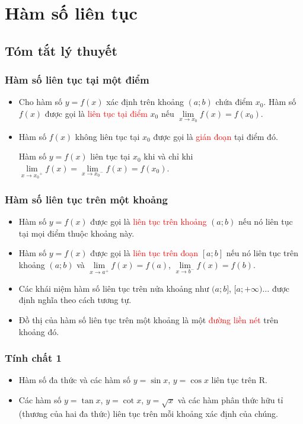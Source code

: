 \section{Hàm số liên tục}
\setcounter{dang}{0}
\subsection{Tóm tắt lý thuyết}
\begin{tomtat}
	\subsubsection{Hàm số liên tục tại một điểm}
	\begin{itemize}
		\item Cho hàm số $y=f(x)$ xác định trên khoảng $(a;b)$ chứa điểm $x_0$. Hàm số $f(x)$ được gọi là \textcolor{red}{liên tục tại điểm} $x_0$ nếu $\lim\limits_{x\to{x_0}}f(x)=f(x_0)$.
		\item Hàm số $f(x)$ không liên tục tại $x_0$ được gọi là \textcolor{red}{gián đoạn} tại điểm đó.
		\begin{note}
			Hàm số $y=f(x)$ liên tục tại $x_0$ khi và chỉ khi $\lim\limits_{x\to{x_0}^+}f(x)=\lim\limits_{x\to{x_0}^-}f(x)=f(x_0)$.
		\end{note}
	\end{itemize}
	\subsubsection{Hàm số liên tục trên một khoảng}
	\begin{itemize}
		\item Hàm số $y=f(x)$ được gọi là \textcolor{red}{liên tục trên khoảng} $(a;b)$ nếu nó liên tục tại mọi điểm thuộc khoảng này.
		\item Hàm số $y=f(x)$ được gọi là \textcolor{red}{liên tục trên đoạn} $[a;b]$ nếu nó liên tục trên khoảng $(a;b)$ và $\lim\limits_{x\to{a}^+}f(x)=f(a)$, $\lim\limits_{x\to{b}^-}f(x)=f(b)$.
		\item Các khái niệm hàm số liên tục trên nửa khoảng như $(a;b]$, $[a;+\infty)\ldots$ được định nghĩa theo cách tương tự.
		\item Đồ thị của hàm số liên tục trên một khoảng là một \textcolor{red}{đường liền nét} trên khoảng đó.
	\end{itemize}
	\subsubsection{Tính chất 1}
	\begin{itemize}
		\item Hàm số đa thức và các hàm số $y=\sin x$, $y=\cos x$ liên tục trên $\mathrm{R}$.
		\item Các hàm số $y=\tan x$, $y=\cot x$, $y=\sqrt x$ và các hàm phân thức hữu tỉ (thương của hai đa thức) liên tục trên mỗi khoảng xác định của chúng.
	\end{itemize}

\end{tomtat}
